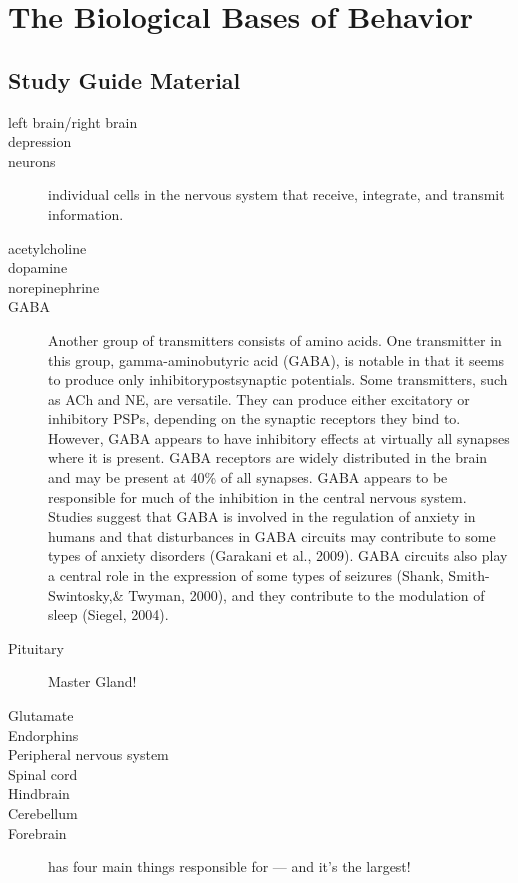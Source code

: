 \documentclass{article}
\begin{document}
\section{The Biological Bases of Behavior}

\subsection{Study Guide Material}
\begin{description}
    \item [left brain/right brain]
    \item [depression]
    \item [neurons] individual cells in the nervous system that receive, integrate, and transmit information.
    \item [acetylcholine]
    \item [dopamine]
    \item [norepinephrine]
    \item [GABA] Another group of transmitters consists of amino acids. One transmitter in this group, gamma-aminobutyric acid (GABA), is notable in that it seems to produce only inhibitorypostsynaptic potentials. Some transmitters, such as ACh and NE, are versatile. They can produce either excitatory or inhibitory PSPs, depending on the synaptic receptors they bind to. However, GABA appears to have inhibitory effects at virtually all synapses where it is present. GABA receptors are widely distributed in the brain and may be present at 40\% of all synapses. GABA appears to be responsible for much of the inhibition in the central nervous system. Studies suggest that GABA is involved in the regulation of anxiety in humans and that disturbances in GABA circuits may contribute to some types of anxiety disorders (Garakani et al., 2009). GABA circuits also play a central role in the expression of some types of seizures (Shank, Smith-Swintosky,\& Twyman, 2000), and they contribute to the modulation of sleep (Siegel, 2004).
    \item [Pituitary] Master Gland!
    \item [Glutamate]
    \item [Endorphins]
    \item [Peripheral nervous system]
    \item [Spinal cord]
    \item [Hindbrain]
    \item [Cerebellum]
    \item [Forebrain] has four main things responsible for --- and it's the largest!

\end{description}
\end{document}
